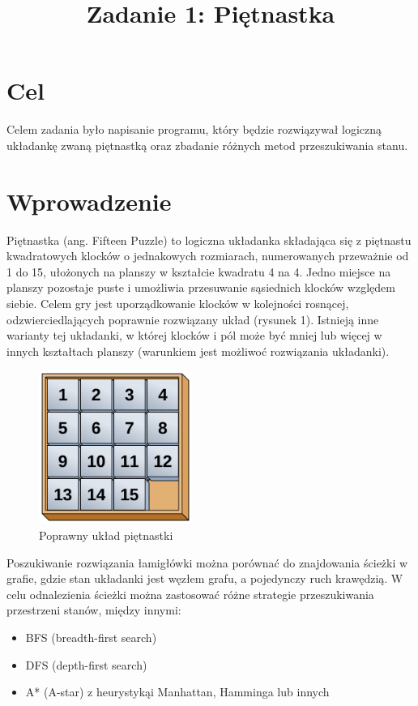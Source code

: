 \documentclass{classrep}
\author{
  \studentinfo{Krzysztof Barden}{210139}
}
\title{Zadanie 1: Piętnastka}
\begin{document}
\maketitle
\newpage
\section{Cel}
Celem zadania było napisanie programu, który będzie rozwiązywał logiczną układankę zwaną piętnastką oraz zbadanie różnych metod przeszukiwania stanu.

\section{Wprowadzenie}
Piętnastka (ang. Fifteen Puzzle) to logiczna układanka składająca się z piętnastu kwadratowych klocków o jednakowych rozmiarach, numerowanych przeważnie od 1 do 15, ułożonych na planszy w kształcie kwadratu 4 na 4. Jedno miejsce na planszy pozostaje puste i umożliwia przesuwanie sąsiednich klocków względem siebie. Celem gry jest uporządkowanie klocków w kolejności rosnącej, odzwierciedlających poprawnie rozwiązany układ (rysunek 1).
Istnieją inne warianty tej układanki, w której klocków i pól może być mniej lub więcej w innych kształtach planszy (warunkiem jest możliwoć rozwiązania układanki).

\begin{figure}[h]
\includegraphics[width=5cm]{fifteen.jpg}
\centering
\caption{Poprawny układ piętnastki}
\end{figure}

Poszukiwanie rozwiązania łamigłówki można porównać do znajdowania ścieżki w grafie, gdzie stan układanki jest węzłem grafu, a pojedynczy ruch krawędzią. W celu odnalezienia ścieżki można zastosować różne strategie przeszukiwania przestrzeni stanów, między innymi:
\begin{itemize}
	\item BFS (breadth-first search)
	\item DFS (depth-first search)
	\item A* (A-star) z heurystykąi Manhattan, Hamminga lub innych
\end{itemize}
\end{document}
